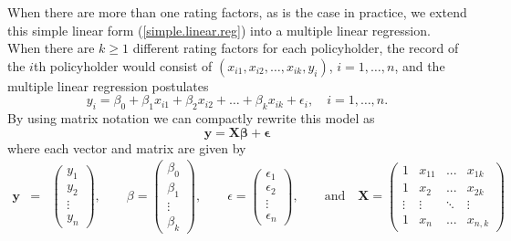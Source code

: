 \documentclass[12pt]{article}
\begin{document}
When there are more than one rating factors, as is the case in practice, we extend this simple linear form (\ref{simple.linear.reg}) into a multiple linear regression. When there are $k \ge 1$ different rating factors for each policyholder, the record of the $i$th policyholder would consist of $(x_{i1}, x_{i2}, \ldots , x_{ik}, y_i)$, $i=1, \ldots,n$, and the multiple linear regression postulates
\begin{equation}
\label{mult.linear.reg}
y_i=\beta_0+\beta_1x_{i1}+\beta_2x_{i2}+\ldots + \beta_k x_{ik}+\epsilon_i, \quad i=1, \ldots,n.
\end{equation}
By using matrix notation we can compactly rewrite this model as
\begin{equation}
\label{mult.linear.reg.mtx}
\mathbf{ y}=\mathbf{ X\beta} +\mathbf{ \epsilon}
\end{equation}
where each vector and matrix are given by
 \begin{eqnarray*}
\mathbf{ y} &=& \left( \begin{array}{c} y_1 \\ y_2 \\ \vdots \\ y_n
              \end{array} \right), \qquad
{\beta} = \left( \begin{array}{c} \beta_0 \\ \beta_1 \\ \vdots \\ \beta_{k}
              \end{array} \right), \qquad
{\epsilon} = \left( \begin{array}{c} \epsilon_1 \\ \epsilon_2 \\ \vdots \\ \epsilon_n
              \end{array} \right), \qquad \text{and} \quad
\mathbf{ X} = \left( \begin{array}{cccc}
        1 & x_{11} & ... &x_{1k} \\
        1 & x_{2}  & ... &x_{2k}\\
       \vdots & \vdots  & \ddots  & \vdots \\
        1 & x_{n} & ... &x_{n,k} \end{array} \right)  \\
 \end{eqnarray*} 
\end{document}
